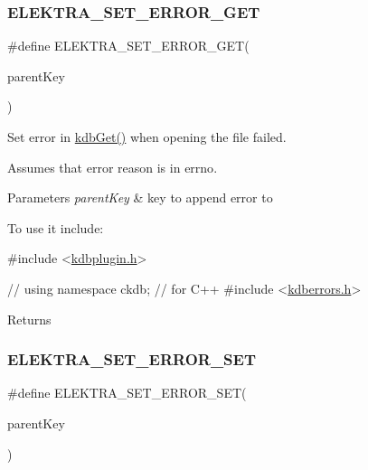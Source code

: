 \subsubsection{\texorpdfstring{E\+L\+E\+K\+T\+R\+A\+\_\+\+S\+E\+T\+\_\+\+E\+R\+R\+O\+R\+\_\+\+G\+ET}{ELEKTRA\_SET\_ERROR\_GET}}
{\footnotesize\ttfamily \#define E\+L\+E\+K\+T\+R\+A\+\_\+\+S\+E\+T\+\_\+\+E\+R\+R\+O\+R\+\_\+\+G\+ET(\begin{DoxyParamCaption}\item[{}]{parent\+Key }\end{DoxyParamCaption})}



Set error in \hyperlink{group__kdb_ga28e385fd9cb7ccfe0b2f1ed2f62453a1}{kdb\+Get()} when opening the file failed. 

Assumes that error reason is in {\ttfamily errno}.


\begin{DoxyParams}{Parameters}
{\em parent\+Key} & key to append error to\\
\hline
\end{DoxyParams}
To use it include\+:


\begin{DoxyCodeInclude}
\textcolor{preprocessor}{#include <\hyperlink{kdbplugin_8h}{kdbplugin.h}>}
\end{DoxyCodeInclude}

\begin{DoxyCodeInclude}
\textcolor{comment}{// using namespace ckdb; // for C++}
\textcolor{preprocessor}{#include <\hyperlink{kdberrors_8h}{kdberrors.h}>}
\end{DoxyCodeInclude}
 \begin{DoxyReturn}{Returns}

\end{DoxyReturn}
\mbox{\label{group__plugin_gaf526686f01dbacd68671732aad4b5d76}} 
\subsubsection{\texorpdfstring{E\+L\+E\+K\+T\+R\+A\+\_\+\+S\+E\+T\+\_\+\+E\+R\+R\+O\+R\+\_\+\+S\+ET}{ELEKTRA\_SET\_ERROR\_SET}}
{\footnotesize\ttfamily \#define E\+L\+E\+K\+T\+R\+A\+\_\+\+S\+E\+T\+\_\+\+E\+R\+R\+O\+R\+\_\+\+S\+ET(\begin{DoxyParamCaption}\item[{}]{parent\+Key }\end{DoxyParamCaption})}




